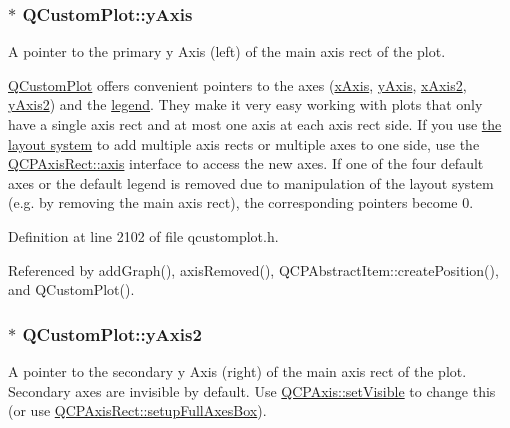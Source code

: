\subsubsection[{y\+Axis}]{ $\ast$ Q\+Custom\+Plot\+::y\+Axis}\label{class_q_custom_plot_af6fea5679725b152c14facd920b19367}
A pointer to the primary y Axis (left) of the main axis rect of the plot.

\hyperlink{class_q_custom_plot}{Q\+Custom\+Plot} offers convenient pointers to the axes (\hyperlink{class_q_custom_plot_a9a79cd0158a4c7f30cbc702f0fd800e4}{x\+Axis}, \hyperlink{class_q_custom_plot_af6fea5679725b152c14facd920b19367}{y\+Axis}, \hyperlink{class_q_custom_plot_ada41599f22cad901c030f3dcbdd82fd9}{x\+Axis2}, \hyperlink{class_q_custom_plot_af13fdc5bce7d0fabd640f13ba805c0b7}{y\+Axis2}) and the \hyperlink{class_q_custom_plot_a4eadcd237dc6a09938b68b16877fa6af}{legend}. They make it very easy working with plots that only have a single axis rect and at most one axis at each axis rect side. If you use \hyperlink{}{the layout system} to add multiple axis rects or multiple axes to one side, use the \hyperlink{class_q_c_p_axis_rect_a560de44e47a4af0f86c59102a094b1e4}{Q\+C\+P\+Axis\+Rect\+::axis} interface to access the new axes. If one of the four default axes or the default legend is removed due to manipulation of the layout system (e.\+g. by removing the main axis rect), the corresponding pointers become 0. 

Definition at line 2102 of file qcustomplot.\+h.



Referenced by add\+Graph(), axis\+Removed(), Q\+C\+P\+Abstract\+Item\+::create\+Position(), and Q\+Custom\+Plot().

\hypertarget{class_q_custom_plot_af13fdc5bce7d0fabd640f13ba805c0b7}{}
\subsubsection[{y\+Axis2}]{ $\ast$ Q\+Custom\+Plot\+::y\+Axis2}\label{class_q_custom_plot_af13fdc5bce7d0fabd640f13ba805c0b7}
A pointer to the secondary y Axis (right) of the main axis rect of the plot. Secondary axes are invisible by default. Use \hyperlink{class_q_c_p_layerable_a3bed99ddc396b48ce3ebfdc0418744f8}{Q\+C\+P\+Axis\+::set\+Visible} to change this (or use \hyperlink{class_q_c_p_axis_rect_a5fa906175447b14206954f77fc7f1ef4}{Q\+C\+P\+Axis\+Rect\+::setup\+Full\+Axes\+Box}).

